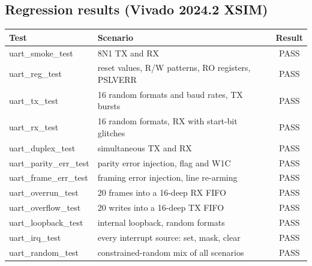 \documentclass[11pt,a4paper]{article}
\begin{document}
\subsection*{Regression results (Vivado 2024.2 XSIM)}
\begin{center}
\small
\begin{tabular}{lp{8.3cm}c}
\toprule
\textbf{Test} & \textbf{Scenario} & \textbf{Result}\\
\midrule
uart\_smoke\_test & 8N1 TX and RX & PASS\\
uart\_reg\_test & reset values, R/W patterns, RO registers, PSLVERR & PASS\\
uart\_tx\_test & 16 random formats and baud rates, TX bursts & PASS\\
uart\_rx\_test & 16 random formats, RX with start-bit glitches & PASS\\
uart\_duplex\_test & simultaneous TX and RX & PASS\\
uart\_parity\_err\_test & parity error injection, flag and W1C & PASS\\
uart\_frame\_err\_test & framing error injection, line re-arming & PASS\\
uart\_overrun\_test & 20 frames into a 16-deep RX FIFO & PASS\\
uart\_overflow\_test & 20 writes into a 16-deep TX FIFO & PASS\\
uart\_loopback\_test & internal loopback, random formats & PASS\\
uart\_irq\_test & every interrupt source: set, mask, clear & PASS\\
uart\_random\_test & constrained-random mix of all scenarios & PASS\\
\bottomrule
\end{tabular}
\end{center}
\end{document}

